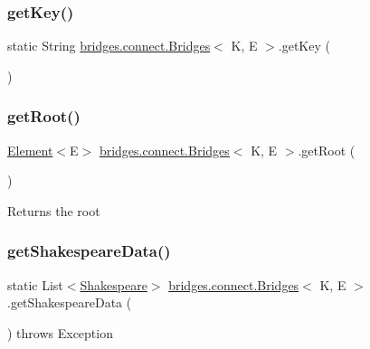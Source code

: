 \subsubsection{\texorpdfstring{get\+Key()}{getKey()}}
{\footnotesize\ttfamily static String \hyperlink{classbridges_1_1connect_1_1_bridges}{bridges.\+connect.\+Bridges}$<$ K, E $>$.get\+Key (\begin{DoxyParamCaption}{ }\end{DoxyParamCaption})\hspace{0.3cm}{\ttfamily [static]}}

\hypertarget{classbridges_1_1connect_1_1_bridges_ad46be93cba155fa93fd9082d9d813466}{}\label{classbridges_1_1connect_1_1_bridges_ad46be93cba155fa93fd9082d9d813466} 
\subsubsection{\texorpdfstring{get\+Root()}{getRoot()}}
{\footnotesize\ttfamily \hyperlink{classbridges_1_1base_1_1_element}{Element}$<$E$>$ \hyperlink{classbridges_1_1connect_1_1_bridges}{bridges.\+connect.\+Bridges}$<$ K, E $>$.get\+Root (\begin{DoxyParamCaption}{ }\end{DoxyParamCaption})}

\begin{DoxyReturn}{Returns}
the root 
\end{DoxyReturn}
\hypertarget{classbridges_1_1connect_1_1_bridges_a03ba87a09742cfb40f357253239006e6}{}\label{classbridges_1_1connect_1_1_bridges_a03ba87a09742cfb40f357253239006e6} 
\subsubsection{\texorpdfstring{get\+Shakespeare\+Data()}{getShakespeareData()}}
{\footnotesize\ttfamily static List$<$\hyperlink{classbridges_1_1data__src__dependent_1_1_shakespeare}{Shakespeare}$>$ \hyperlink{classbridges_1_1connect_1_1_bridges}{bridges.\+connect.\+Bridges}$<$ K, E $>$.get\+Shakespeare\+Data (\begin{DoxyParamCaption}{ }\end{DoxyParamCaption}) throws Exception\hspace{0.3cm}{\ttfamily [static]}}

